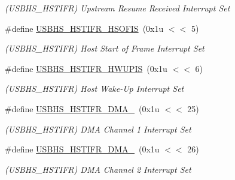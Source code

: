 \begin{DoxyCompactItemize}
\begin{DoxyCompactList}\small\item\em (U\+S\+B\+H\+S\+\_\+\+H\+S\+T\+I\+FR) Upstream Resume Received Interrupt Set \end{DoxyCompactList}\item 
\mbox{\label{group__SAME70__USBHS_ga058eec9cbe60b84e56a33cb97ad48712}} 
\#define \mbox{\hyperlink{group__SAME70__USBHS_ga058eec9cbe60b84e56a33cb97ad48712}{U\+S\+B\+H\+S\+\_\+\+H\+S\+T\+I\+F\+R\+\_\+\+H\+S\+O\+F\+IS}}~(0x1u $<$$<$ 5)
\begin{DoxyCompactList}\small\item\em (U\+S\+B\+H\+S\+\_\+\+H\+S\+T\+I\+FR) Host Start of Frame Interrupt Set \end{DoxyCompactList}\item 
\mbox{\label{group__SAME70__USBHS_gabfdb08e9e4fe591cd781dd845c9b7712}} 
\#define \mbox{\hyperlink{group__SAME70__USBHS_gabfdb08e9e4fe591cd781dd845c9b7712}{U\+S\+B\+H\+S\+\_\+\+H\+S\+T\+I\+F\+R\+\_\+\+H\+W\+U\+P\+IS}}~(0x1u $<$$<$ 6)
\begin{DoxyCompactList}\small\item\em (U\+S\+B\+H\+S\+\_\+\+H\+S\+T\+I\+FR) Host Wake-\/\+Up Interrupt Set \end{DoxyCompactList}\item 
\mbox{\label{group__SAME70__USBHS_gac1888edbfcc052261aa510d80d58e295}} 
\#define \mbox{\hyperlink{group__SAME70__USBHS_gac1888edbfcc052261aa510d80d58e295}{U\+S\+B\+H\+S\+\_\+\+H\+S\+T\+I\+F\+R\+\_\+\+D\+M\+A\+\_}}~(0x1u $<$$<$ 25)
\begin{DoxyCompactList}\small\item\em (U\+S\+B\+H\+S\+\_\+\+H\+S\+T\+I\+FR) D\+MA Channel 1 Interrupt Set \end{DoxyCompactList}\item 
\mbox{\label{group__SAME70__USBHS_ga50434e1d59cd6cdc2450bd0006417753}} 
\#define \mbox{\hyperlink{group__SAME70__USBHS_ga50434e1d59cd6cdc2450bd0006417753}{U\+S\+B\+H\+S\+\_\+\+H\+S\+T\+I\+F\+R\+\_\+\+D\+M\+A\+\_}}~(0x1u $<$$<$ 26)
\begin{DoxyCompactList}\small\item\em (U\+S\+B\+H\+S\+\_\+\+H\+S\+T\+I\+FR) D\+MA Channel 2 Interrupt Set \end{DoxyCompactList}\item 

\end{DoxyCompactItemize}

